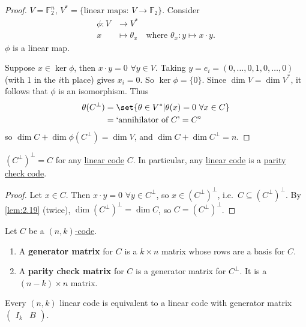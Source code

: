 \documentclass{article}
\newcommand{\1}[1]{\mathbbm{1}_{#1}}
\begin{document}
\begin{proof}
    $V = \mathbb{F}_2^n$, $V^* = \{\text{linear maps: }V \to \mathbb{F}_2\}$. Consider
    \begin{align*}
        \phi : V &\longrightarrow V^* \\
        x &\longmapsto \theta_x \quad \text{where } \theta_x : y \longmapsto x \cdot y.
    \end{align*}
    $\phi$ is a linear map.

    Suppose $x \in \ker \phi$, then $x \cdot y = 0$ $\forall y \in V$.
    Taking $y = e_i = (0, \dotsc, 0, 1, 0, \dotsc, 0)$ (with 1 in the $i$th place) gives $x_i = 0$. So $\ker \phi = \{0\}$.
    Since $\dim V = \dim V^*$, it follows that $\phi$ is an isomorphism.
    Thus
    \begin{align*}
        \theta(C^\perp) &= \set{\theta \in V^* | \theta(x) = 0 \ \forall x \in C} \\
                        &= \text{`annihilator of $C$'} = C^\circ
    \end{align*}
    so $\dim C + \dim \phi(C^\perp) = \dim V$, and $\dim C + \dim C^\perp = n$.
\end{proof}
\begin{cor}
    $(C^\perp)^\perp = C$ for any \hyperlink{def:linearCode}{linear code} $C$.
    In particular, any \hyperlink{def:linearCode}{linear code} is a \hyperlink{def:parityCheckCode}{parity check code}.
\end{cor}
\begin{proof}
    Let $x \in C$. Then $x \cdot y = 0$ $\forall y \in C^\perp$, so $x \in (C^\perp)^\perp$, i.e.\ $C \subseteq (C^\perp)^\perp$.
    By \cref{lem:2.19} (twice), $\dim (C^\perp)^\perp = \dim C$, so $C = (C^\perp)^\perp$.
\end{proof}
\begin{defi}
    Let $C$ be a \hyperlink{def:nkCode}{$(n, k)$-code}.
    \begin{enumerate}[label=(\roman*)]
        \item A \textbf{generator matrix} for $C$ is a $k \times n$ matrix whose rows are a basis for $C$.
        \item A \textbf{parity check matrix} for $C$ is a generator matrix for $C^\perp$. It is a $(n-k) \times n$ matrix.
    \end{enumerate}
\end{defi}
\begin{nlemma}\label{lem:2.20}
    Every $(n, k)$ linear code is equivalent to  a linear code with generator matrix $\left( \begin{array}{c|c} I_k & B \end{array}\right)$.
\end{nlemma}
\end{document}
